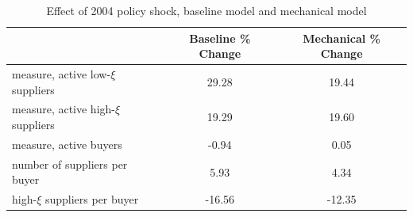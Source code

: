 \begin{table}[h!]\centering
\caption{Effect of 2004 policy shock, baseline model and mechanical model}
\begin{tabular}{lcc}
\hline\hline
 & Baseline \% Change & Mechanical \% Change \\
\hline
measure, active low-$\xi$ suppliers & 29.28 & 19.44 \\
measure, active high-$\xi$ suppliers & 19.29 & 19.60 \\
measure, active buyers & -0.94 & 0.05 \\
number of suppliers per buyer & 5.93 & 4.34 \\
high-$\xi$ suppliers per buyer & -16.56 & -12.35 \\
\hline
\end{tabular}
\end{table}
